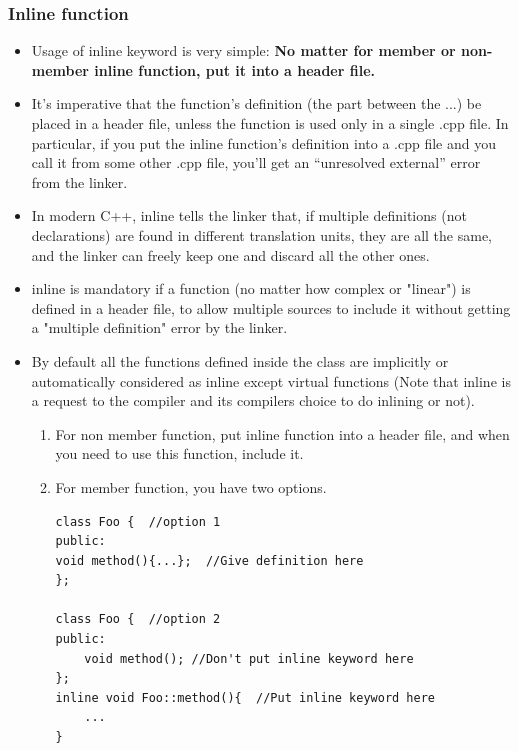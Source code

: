 \documentclass[a4paper,11pt,twoside]{book}
\begin{document}
\subsubsection{Inline function}
\begin{itemize}
	\item Usage of inline keyword is very simple: \textbf{No matter for member or non-member inline function, put it into a header file.}
	
	\item It’s imperative that the function’s definition (the part between the {...}) be placed in a header file, unless the function is used only in a single .cpp file. In particular, if you put the inline function’s definition into a .cpp file and you call it from some other .cpp file, you’ll get an “unresolved external” error from the linker.
	
	\item In modern C++, inline tells the linker that, if multiple definitions (not declarations) are found in different translation units, they are all the same, and the linker can freely keep one and discard all the other ones.
	
	\item inline is mandatory if a function (no matter how complex or "linear") is defined in a header file, to allow multiple sources to include it without getting a "multiple definition" error by the linker.
	
	\item By default all the functions defined inside the class are implicitly or automatically considered as inline except virtual functions (Note that inline is a request to the compiler and its compilers choice to do inlining or not).
	
	\begin{enumerate}
		\item For non member function, put inline function into a header file, and when you need to use this function, include it.
		
		\item For member function, you have two options.
\begin{lstlisting}[numbers=none]
class Foo {  //option 1
public:
void method(){...};  //Give definition here
};

class Foo {  //option 2
public:
	void method(); //Don't put inline keyword here
};
inline void Foo::method(){  //Put inline keyword here
	...
}
\end{lstlisting}
	\end{enumerate}
	

\end{itemize}
\end{document}
